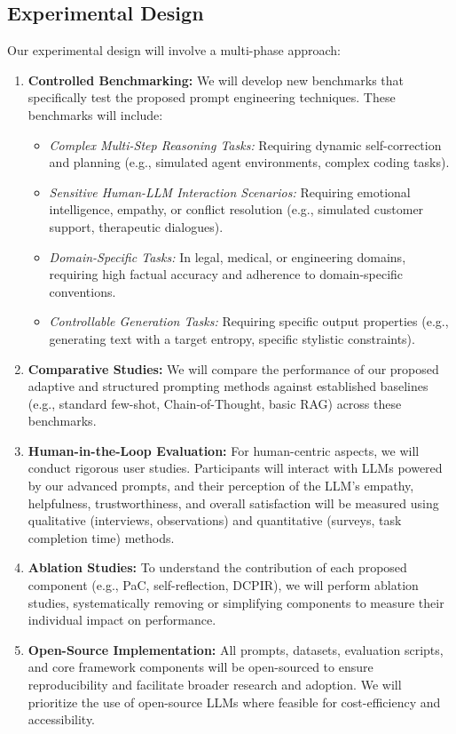 \documentclass{article}
\begin{document}
\subsection{Experimental Design}
Our experimental design will involve a multi-phase approach:
\begin{enumerate}
    \item \textbf{Controlled Benchmarking:} We will develop new benchmarks that specifically test the proposed prompt engineering techniques. These benchmarks will include:
    \begin{itemize}
        \item \textit{Complex Multi-Step Reasoning Tasks:} Requiring dynamic self-correction and planning (e.g., simulated agent environments, complex coding tasks).
        \item \textit{Sensitive Human-LLM Interaction Scenarios:} Requiring emotional intelligence, empathy, or conflict resolution (e.g., simulated customer support, therapeutic dialogues).
        \item \textit{Domain-Specific Tasks:} In legal, medical, or engineering domains, requiring high factual accuracy and adherence to domain-specific conventions.
        \item \textit{Controllable Generation Tasks:} Requiring specific output properties (e.g., generating text with a target entropy, specific stylistic constraints).
    \end{itemize}
    \item \textbf{Comparative Studies:} We will compare the performance of our proposed adaptive and structured prompting methods against established baselines (e.g., standard few-shot, Chain-of-Thought, basic RAG) across these benchmarks.
    \item \textbf{Human-in-the-Loop Evaluation:} For human-centric aspects, we will conduct rigorous user studies. Participants will interact with LLMs powered by our advanced prompts, and their perception of the LLM's empathy, helpfulness, trustworthiness, and overall satisfaction will be measured using qualitative (interviews, observations) and quantitative (surveys, task completion time) methods.
    \item \textbf{Ablation Studies:} To understand the contribution of each proposed component (e.g., PaC, self-reflection, DCPIR), we will perform ablation studies, systematically removing or simplifying components to measure their individual impact on performance.
    \item \textbf{Open-Source Implementation:} All prompts, datasets, evaluation scripts, and core framework components will be open-sourced to ensure reproducibility and facilitate broader research and adoption. We will prioritize the use of open-source LLMs where feasible for cost-efficiency and accessibility.
\end{enumerate}
\end{document}
